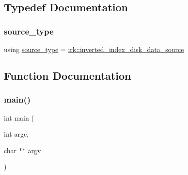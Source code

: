 \subsection{Typedef Documentation}
\mbox{\label{irk-score_8cpp_a73f57f67fb1e33bdbfd80bfba2fc9ffe}} 
\subsubsection{\texorpdfstring{source\+\_\+type}{source\_type}}
{\footnotesize\ttfamily using \mbox{\hyperlink{irk-score_8cpp_a73f57f67fb1e33bdbfd80bfba2fc9ffe}{source\+\_\+type}} =  \mbox{\hyperlink{classirk_1_1inverted__index__disk__data__source}{irk\+::inverted\+\_\+index\+\_\+disk\+\_\+data\+\_\+source}}}



\subsection{Function Documentation}
\mbox{\label{irk-score_8cpp_a3c04138a5bfe5d72780bb7e82a18e627}} 
\subsubsection{\texorpdfstring{main()}{main()}}
{\footnotesize\ttfamily int main (\begin{DoxyParamCaption}\item[{int}]{argc,  }\item[{char $\ast$$\ast$}]{argv }\end{DoxyParamCaption})}


